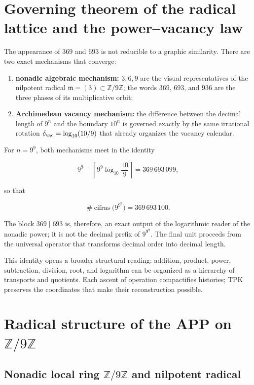 \section{Governing theorem of the radical lattice and the power--vacancy law}

The appearance of \(369\) and \(693\) is not reducible to a graphic similarity. There are two exact mechanisms that converge:

\begin{enumerate}
\item \textbf{nonadic algebraic mechanism:} \(3,6,9\) are the visual representatives of the nilpotent radical \(\mathfrak m=(3)\subset\mathbb Z/9\mathbb Z\); the words \(369\), \(693\), and \(936\) are the three phases of its multiplicative orbit;
\item \textbf{Archimedean vacancy mechanism:} the difference between the decimal length of \(9^n\) and the boundary \(10^n\) is governed exactly by the same irrational rotation \(\delta_{\rm vac}=\log_{10}(10/9)\) that already organizes the vacancy calendar.
\end{enumerate}

For \(n=9^9\), both mechanisms meet in the identity

\[
9^9-\left\lceil 9^9\log_{10}\frac{10}{9}\right\rceil
=369\,693\,099,
\]

so that

\[
\#\operatorname{cifras}\bigl(9^{9^9}\bigr)=369\,693\,100.
\]

The block \(369\mid693\) is, therefore, an exact output of the logarithmic reader of the nonadic power; it is not the decimal prefix of \(9^{9^9}\). The final unit proceeds from the universal operator that transforms decimal order into decimal length.

This identity opens a broader structural reading: addition, product, power, subtraction, division, root, and logarithm can be organized as a hierarchy of transports and quotients. Each ascent of operation compactifies histories; TPK preserves the coordinates that make their reconstruction possible.


\section{Radical structure of the APP on \(\mathbb Z/9\mathbb Z\)}

\subsection{Nonadic local ring \(\mathbb Z/9\mathbb Z\) and nilpotent radical}

